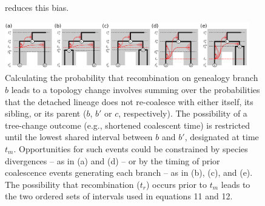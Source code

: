 \documentclass[11pt]{article}
\begin{document}
\begin{figure}[p]
{{		reduces this bias.		
		}
	}
     \label{fig:figS-bias-topo-last}
\end{figure}




\begin{figure}[p]
	\centering
	\includegraphics[width=0.95\textwidth]{figures/FigS-tbm.pdf}
	\caption{
		Calculating the probability that recombination on genealogy branch 
		$b$ leads to a topology change involves summing over the probabilities 
		that the detached lineage does not re-coalesce with either
		itself, its sibling, or its parent ($b$, $b'$ or $c$, respectively). 
		The possibility of a tree-change outcome (e.g., shortened coalescent 
		time) is restricted until the lowest shared interval between $b$ and 
		$b'$, designated at time $t_m$. Opportunities for such events could be
		constrained by species divergences -- as in (a) and (d) -- or by the timing of 
		prior coalescence events generating each branch -- as in (b), (c), and (e). 
		The possibility that recombination ($t_r$) occurs prior
		to $t_m$ leads to the two ordered sets of intervals used in 
		equations 11 and 12.
	}
	\label{fig:figS-tbm}
\end{figure}
\end{document}
